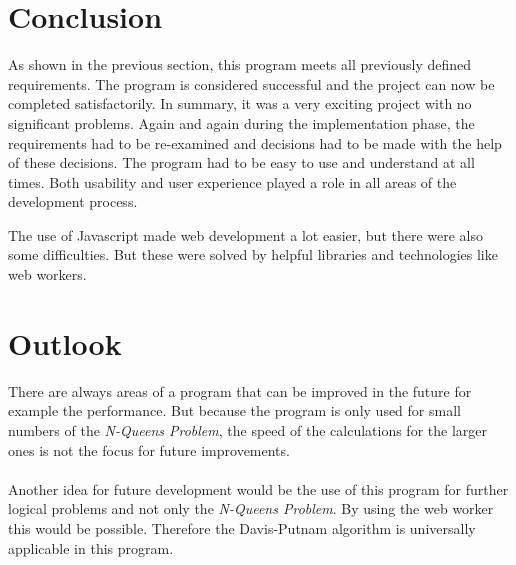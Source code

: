 \section{Conclusion}
\label{sec:proConclusion}
As shown in the previous section, this program meets all previously defined requirements. The program is considered successful and the project can now be completed satisfactorily. In summary, it was a very exciting project with no significant problems. Again and again during the implementation phase, the requirements had to be re-examined and decisions had to be made with the help of these decisions. The program had to be easy to use and understand at all times. Both usability and user experience played a role in all areas of the development process. 

The use of Javascript made web development a lot easier, but there were also some difficulties. But these were solved by helpful libraries and technologies like web workers. 

\section{Outlook}
\label{sec:proOutlook}

There are always areas of a program that can be improved in the future for example the performance. But because the program is only used for small numbers of the \textit{N-Queens Problem}, the speed of the calculations for the larger ones is not the focus for future improvements.  \\
\\
Another idea for future development would be the use of this program for further logical problems and not only the \textit{N-Queens Problem}. By using the web worker this would be possible. Therefore the Davis-Putnam algorithm is universally applicable in this program.
